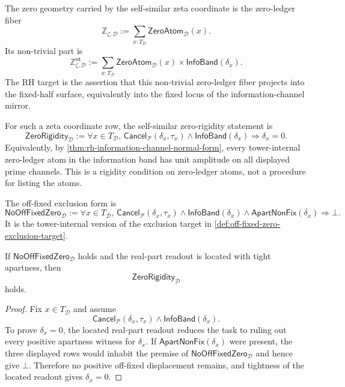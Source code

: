 \begin{definition}
\label{def:zero-ledger-fiber-geometry}
The zero geometry carried by the self-similar zeta coordinate is the
zero-ledger fiber
$$
\mathbb Z_{\zeta,\mathcal D}
:=
\sum_{x:T_{\mathcal D}}
\mathsf{ZeroAtom}_{\mathcal D}(x).
$$
Its non-trivial part is
$$
\mathbb Z^{\mathsf{nt}}_{\zeta,\mathcal D}
:=
\sum_{x:T_{\mathcal D}}
\mathsf{ZeroAtom}_{\mathcal D}(x)
\times
\mathsf{InfoBand}(\delta_x).
$$
The RH target is the assertion that this non-trivial zero-ledger fiber
projects into the fixed-half surface, equivalently into the fixed locus of
the information-channel mirror.
\end{definition}

\begin{definition}
\label{def:self-similar-zero-rigidity}
For such a zeta coordinate row, the self-similar zero-rigidity statement
is
$$
\mathsf{ZeroRigidity}_{\mathcal D}
:=
\forall x\in T_{\mathcal D},\,
\mathsf{Cancel}_{\mathcal P}(\delta_x,\tau_x)
\wedge
\mathsf{InfoBand}(\delta_x)
\Longrightarrow
\delta_x=0.
$$
Equivalently, by \autoref{thm:rh-information-channel-normal-form}, every
tower-internal zero-ledger atom in the information band has unit amplitude
on all displayed prime channels.  This is a rigidity condition on
zero-ledger atoms, not a procedure for listing the atoms.
\end{definition}

\begin{definition}
\label{def:self-similar-off-fixed-exclusion}
The off-fixed exclusion form is
$$
\mathsf{NoOffFixedZero}_{\mathcal D}
:=
\forall x\in T_{\mathcal D},\,
\mathsf{Cancel}_{\mathcal P}(\delta_x,\tau_x)
\wedge
\mathsf{InfoBand}(\delta_x)
\wedge
\mathsf{ApartNonFix}(\delta_x)
\Longrightarrow
\bot.
$$
It is the tower-internal version of the exclusion target in
\autoref{def:off-fixed-zero-exclusion-target}.
\end{definition}

\begin{theorem}
\label{thm:off-fixed-exclusion-gives-zero-rigidity}
If $\mathsf{NoOffFixedZero}_{\mathcal D}$ holds and the real-part readout
is located with tight apartness, then
$$
\mathsf{ZeroRigidity}_{\mathcal D}
$$
holds.
\end{theorem}

\begin{proof}
Fix $x\in T_{\mathcal D}$ and assume
$$
\mathsf{Cancel}_{\mathcal P}(\delta_x,\tau_x)
\wedge
\mathsf{InfoBand}(\delta_x).
$$
To prove $\delta_x=0$, the located real-part readout reduces the task to
ruling out every positive apartness witness for $\delta_x$.  If
$\mathsf{ApartNonFix}(\delta_x)$ were present, the three displayed rows
would inhabit the premise of
$\mathsf{NoOffFixedZero}_{\mathcal D}$ and hence give $\bot$.  Therefore no
positive off-fixed displacement remains, and tightness of the located
readout gives $\delta_x=0$.
\end{proof}

